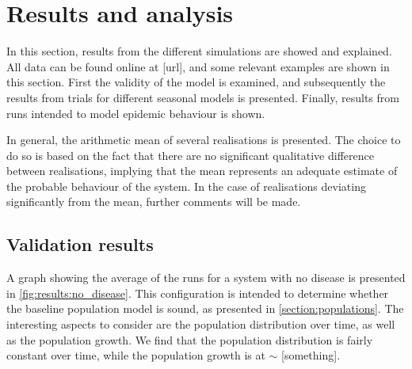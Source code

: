 \documentclass[10pt,a4paper]{article}
\begin{document}

\section{Results and analysis}

In this section, results from the different simulations are showed and explained. All data can be found online at [url], and some relevant examples are shown in this section. First the validity of the model is examined, and subsequently the results from trials for different seasonal models is presented. Finally, results from runs intended to model epidemic behaviour is shown.

In general, the arithmetic mean of several realisations is presented. The choice to do so is based on the fact that there are no significant qualitative difference between realisations, implying that the mean represents an adequate estimate of the probable behaviour of the system. In the case of realisations deviating significantly from the mean, further comments will be made.

\subsection{Validation results}

A graph showing the average of the runs for a system with no disease is presented in \cref{fig:results:no_disease}. This configuration is intended to determine whether the baseline population model is sound, as presented in \cref{section:populations}. The interesting aspects to consider are the population distribution over time, as well as the population growth. We find that the population distribution is fairly constant over time, while the population growth is at $\sim$ [something].
\end{document}
